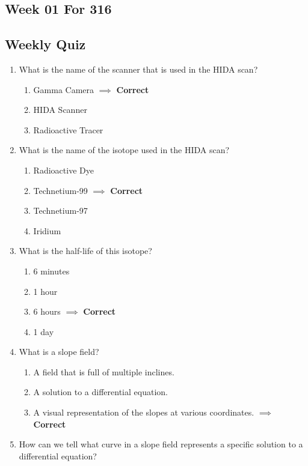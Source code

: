 \documentclass[11pt]{article}
\begin{document}
	
\begin{center}\section*{Week 01 For 316}\end{center}
\subsection*{Weekly Quiz}
\begin{enumerate}
	\item What is the name of the scanner that is used in the HIDA scan?
	\begin{enumerate}
		\item Gamma Camera $\implies$ \textbf{Correct}
		\item HIDA Scanner
		\item Radioactive Tracer
	\end{enumerate}
	\item What is the name of the isotope used in the HIDA scan?
	\begin{enumerate}
		\item Radioactive Dye 
		\item Technetium-99 $\implies$ \textbf{Correct}
 		\item Technetium-97
		\item Iridium	
	\end{enumerate}
	\item What is the half-life of this isotope?
	\begin{enumerate}
		\item 6 minutes
		\item 1 hour
		\item 6 hours $\implies$ \textbf{Correct}
		\item 1 day
	\end{enumerate}
	\item What is a slope field?
	\begin{enumerate}
		\item A field that is full of multiple inclines.
		\item A solution to a differential equation.
		\item A visual representation of the slopes at various coordinates. $\implies$ \textbf{Correct}
	\end{enumerate}
	\item How can we tell what curve in a slope field represents a specific solution to a differential equation?
	\begin{enumerate}

\end{enumerate}
\end{enumerate}
\end{document}
